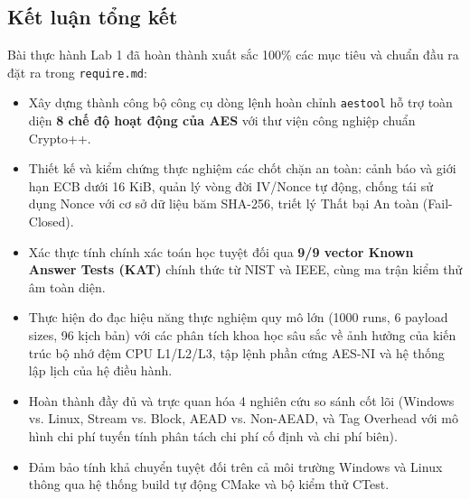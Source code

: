\documentclass[12pt, a4paper]{report}
\begin{document}
\subsection{Kết luận tổng kết}
Bài thực hành Lab 1 đã hoàn thành xuất sắc 100\% các mục tiêu và chuẩn đầu ra đặt ra trong \texttt{require.md}:
\begin{itemize}
    \item Xây dựng thành công bộ công cụ dòng lệnh hoàn chỉnh \texttt{aestool} hỗ trợ toàn diện \textbf{8 chế độ hoạt động của AES} với thư viện công nghiệp chuẩn Crypto++.
    \item Thiết kế và kiểm chứng thực nghiệm các chốt chặn an toàn: cảnh báo và giới hạn ECB dưới 16 KiB, quản lý vòng đời IV/Nonce tự động, chống tái sử dụng Nonce với cơ sở dữ liệu băm SHA-256, triết lý Thất bại An toàn (Fail-Closed).
    \item Xác thực tính chính xác toán học tuyệt đối qua \textbf{9/9 vector Known Answer Tests (KAT)} chính thức từ NIST và IEEE, cùng ma trận kiểm thử âm toàn diện.
    \item Thực hiện đo đạc hiệu năng thực nghiệm quy mô lớn (1000 runs, 6 payload sizes, 96 kịch bản) với các phân tích khoa học sâu sắc về ảnh hưởng của kiến trúc bộ nhớ đệm CPU L1/L2/L3, tập lệnh phần cứng AES-NI và hệ thống lập lịch của hệ điều hành.
    \item Hoàn thành đầy đủ và trực quan hóa 4 nghiên cứu so sánh cốt lõi (Windows vs. Linux, Stream vs. Block, AEAD vs. Non-AEAD, và Tag Overhead với mô hình chi phí tuyến tính phân tách chi phí cố định và chi phí biên).
    \item Đảm bảo tính khả chuyển tuyệt đối trên cả môi trường Windows và Linux thông qua hệ thống build tự động CMake và bộ kiểm thử CTest.
\end{itemize}
\end{document}
